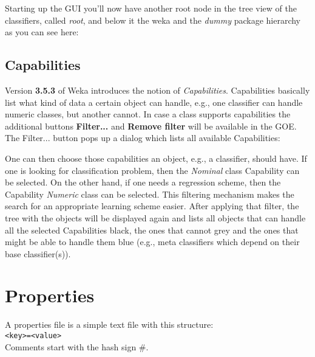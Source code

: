 \noindent Starting up the GUI you'll now have another root node in the
tree view of the classifiers, called \textit{root}, and below it the weka and
the \textit{dummy} package hierarchy as you can see here:

\begin{center}
\end{center}

\subsection{Capabilities}
Version \textbf{3.5.3} of Weka introduces the notion of
\textit{Capabilities}. Capabilities basically list what kind of data a
certain object can handle, e.g., one classifier can handle numeric
classes, but another cannot. In case a class supports capabilities the
additional buttons \textbf{Filter...} and \textbf{Remove filter} will
be available in the GOE. The Filter... button pops up a dialog which
lists all available Capabilities:

\begin{center}
\end{center}

\noindent One can then choose those capabilities an object, e.g., a
classifier, should have. If one is looking for classification problem,
then the \textit{Nominal} class Capability can be selected. On the other hand,
if one needs a regression scheme, then the Capability \textit{Numeric} class
can be selected. This filtering mechanism makes the search for an
appropriate learning scheme easier. After applying that filter, the
tree with the objects will be displayed again and lists all objects
that can handle all the selected Capabilities black, the ones that
cannot grey and the ones that might be able to handle them blue (e.g.,
meta classifiers which depend on their base classifier(s)).

\section{Properties}
A properties file is a simple text file with this structure:\\

\verb^<key>=<value>^\\

\noindent Comments start with the hash sign \#.\\

